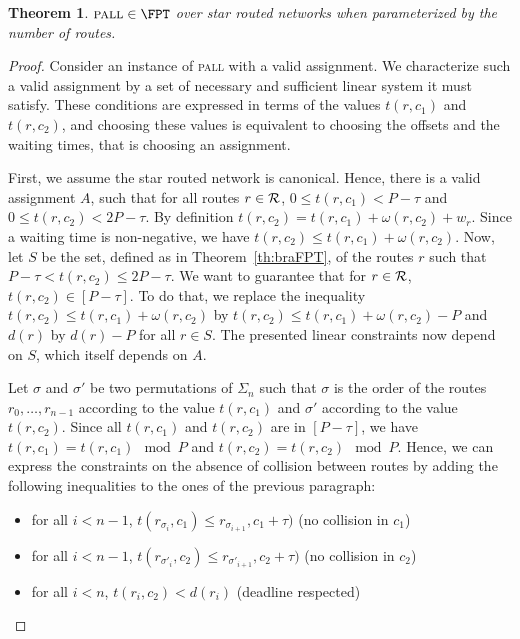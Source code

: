 \documentclass[a4paper,10pt]{journal}
\newtheorem{theorem}{Theorem}
\newcommand\pall{\textsc{pall}\xspace}
\begin{document}
\begin{theorem}\label{th:pallFPT}
$\pall \in \FPT$ over star routed networks when parameterized by the number of routes.
\end{theorem}
\begin{proof}
 Consider an instance of \pall with a valid assignment. We characterize such a valid assignment by a set of necessary and sufficient linear system it must satisfy.  These conditions are expressed in terms of the values $t(r,c_1)$ and $t(r,c_2)$, and choosing these values is equivalent to choosing the offsets and the waiting times, that is choosing an assignment.

First, we assume the star routed network is canonical. Hence, there is a valid assignment $A$, such that for all routes $r \in \cal{R}$, $0 \leq t(r,c_1) < P -\tau$ and $0 \leq t(r,c_2) < 2P-\tau$. 
By definition $t(r,c_2) = t(r,c_1) + \omega(r,c_2) + w_r$. Since a waiting time is non-negative, we have $t(r,c_2) \leq t(r,c_1) + \omega(r,c_2)$. 
Now, let $S$ be the set, defined as in Theorem~\ref{th:braFPT}, of the routes $r$ such that  $P - \tau < t(r,c_2) \leq 2P - \tau$. We want to guarantee that for $r \in \cal{R}$, $t(r,c_2) \in [P-\tau]$.
To do that, we replace the inequality $t(r,c_2) \leq t(r,c_1) + \omega(r,c_2)$ by $t(r,c_2) \leq t(r,c_1) + \omega(r,c_2) - P$ and $d(r)$ by $d(r) - P$ for all $r \in S$. The presented linear constraints now depend on $S$, which itself depends on $A$.

 Let $\sigma$ and $\sigma'$ be two permutations of $\Sigma_n$ such that $\sigma$ is the order 
 of the routes $r_0,\dots, r_{n-1}$ according to the value $t(r,c_1)$ and $\sigma'$ according to the value $t(r,c_2)$.  Since all $t(r,c_1)$ and $t(r,c_2)$ are in $[P-\tau]$, we have $t(r,c_1) = t(r,c_1) \mod P $ and $t(r,c_2) = t(r,c_2) \mod P $. Hence, we can express the constraints on the absence of collision between routes by adding the following inequalities to the ones of the previous paragraph:
 
 \begin{itemize}
 	\item for all $i < n-1$, $t(r_{\sigma_{i}},c_1) \leq r_{\sigma_{i+1}},c_1 + \tau)$ (no collision in $c_1$)
 	\item for all $i < n-1$, $t(r_{\sigma'_{i}},c_2) \leq r_{\sigma'_{i+1}},c_2 + \tau)$ (no collision in $c_2$)
 	\item for all $i < n$,  $t(r_{i},c_2) < d(r_i)$ (deadline respected)
 \end{itemize}


\end{proof}
\end{document}

